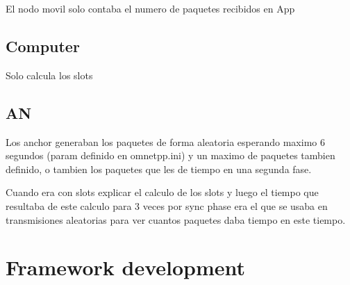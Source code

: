 El nodo movil solo contaba el numero de paquetes recibidos en App

\subsection{\ac{Computer}}

Solo calcula los slots

\subsection{\ac{AN}}

Los anchor generaban los paquetes de forma aleatoria esperando maximo 6 segundos (param definido en omnetpp.ini) y un maximo de paquetes tambien 
definido, o tambien los paquetes que les de tiempo en una segunda fase.

Cuando era con slots explicar el calculo de los slots y luego el tiempo que resultaba de este calculo para 3 veces por sync phase era el que se 
usaba en transmisiones aleatorias para ver cuantos paquetes daba tiempo en este tiempo.


\section{Framework development}
